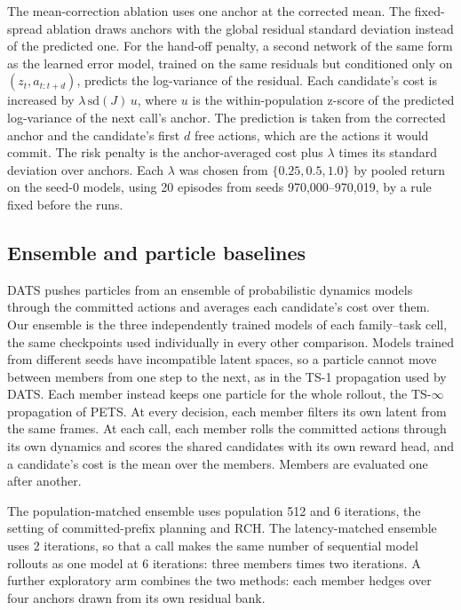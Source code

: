 \documentclass[pdflatex,sn-nature]{sn-jnl}%
\begin{document}
The mean-correction ablation uses one anchor at the corrected mean. The fixed-spread ablation draws anchors with the global residual standard deviation instead of the predicted one. For the hand-off penalty, a second network of the same form as the learned error model, trained on the same residuals but conditioned only on $(z_t, a_{t:t+d})$, predicts the log-variance of the residual. Each candidate's cost is increased by $\lambda\,\mathrm{sd}(J)\,u$, where $u$ is the within-population z-score of the predicted log-variance of the next call's anchor. The prediction is taken from the corrected anchor and the candidate's first $d$ free actions, which are the actions it would commit. The risk penalty is the anchor-averaged cost plus $\lambda$ times its standard deviation over anchors. Each $\lambda$ was chosen from $\{0.25, 0.5, 1.0\}$ by pooled return on the seed-0 models, using 20 episodes from seeds 970,000--970,019, by a rule fixed before the runs.

\subsection{Ensemble and particle baselines}\label{sec:ensemble-methods}

DATS\cite{chen2020dats} pushes particles from an ensemble of probabilistic dynamics models through the committed actions and averages each candidate's cost over them. Our ensemble is the three independently trained models of each family--task cell, the same checkpoints used individually in every other comparison. Models trained from different seeds have incompatible latent spaces, so a particle cannot move between members from one step to the next, as in the TS-1 propagation used by DATS. Each member instead keeps one particle for the whole rollout, the TS-$\infty$ propagation of PETS\cite{chua2018pets}. At every decision, each member filters its own latent from the same frames. At each call, each member rolls the committed actions through its own dynamics and scores the shared candidates with its own reward head, and a candidate's cost is the mean over the members. Members are evaluated one after another.

The population-matched ensemble uses population 512 and 6 iterations, the setting of committed-prefix planning and RCH. The latency-matched ensemble uses 2 iterations, so that a call makes the same number of sequential model rollouts as one model at 6 iterations: three members times two iterations. A further exploratory arm combines the two methods: each member hedges over four anchors drawn from its own residual bank.
\end{document}
